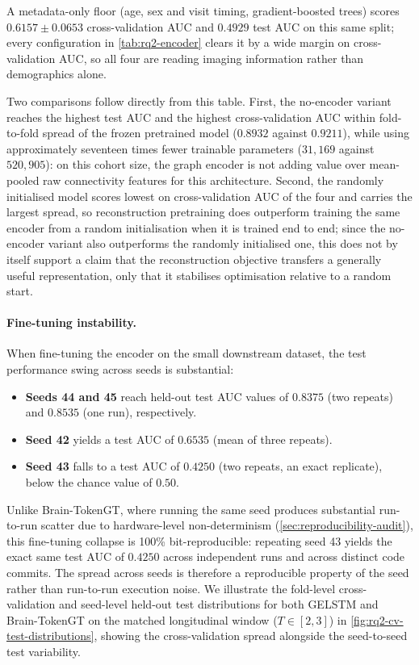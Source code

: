 A metadata-only floor (age, sex and visit timing, gradient-boosted trees) scores
$0.6157 \pm 0.0653$ cross-validation \ac{AUC} and $0.4929$ test \ac{AUC} on this same split;
every configuration in \autoref{tab:rq2-encoder} clears it by a wide margin on cross-validation
\ac{AUC}, so all four are reading imaging information rather than demographics alone.

Two comparisons follow directly from this table. First, the no-encoder variant reaches the
highest test \ac{AUC} and the highest cross-validation \ac{AUC} within fold-to-fold spread
of the frozen pretrained model ($0.8932$ against $0.9211$), while using approximately
seventeen times fewer trainable parameters ($31{,}169$ against $520{,}905$): on this cohort
size, the graph encoder is not adding value over mean-pooled raw connectivity features for
this architecture. Second, the randomly initialised model scores lowest on cross-validation
\ac{AUC} of the four and carries the largest spread, so reconstruction pretraining does
outperform training the same encoder from a random initialisation when it is trained end to
end; since the no-encoder variant also outperforms the randomly initialised one, this does not
by itself support a claim that the reconstruction objective transfers a generally useful
representation, only that it stabilises optimisation relative to a random start.

\paragraph{Fine-tuning instability.} When fine-tuning the encoder on the small downstream dataset, the test performance swing across seeds is substantial:
\begin{itemize}
  \item \textbf{Seeds 44 and 45} reach held-out test \ac{AUC} values of $0.8375$ (two repeats) and $0.8535$ (one run), respectively.
  \item \textbf{Seed 42} yields a test \ac{AUC} of $0.6535$ (mean of three repeats).
  \item \textbf{Seed 43} falls to a test \ac{AUC} of $0.4250$ (two repeats, an exact replicate), below the chance value of $0.50$.
\end{itemize}
Unlike Brain-TokenGT, where running the same seed produces substantial run-to-run scatter due to hardware-level non-determinism (\autoref{sec:reproducibility-audit}), this fine-tuning collapse is 100\% bit-reproducible: repeating seed 43 yields the exact same test \ac{AUC} of $0.4250$ across independent runs and across distinct code commits. The spread across seeds is therefore a reproducible property of the seed rather than run-to-run execution noise. We illustrate the fold-level cross-validation and seed-level held-out test distributions for both \ac{GELSTM} and Brain-TokenGT on the matched longitudinal window ($T \in [2, 3]$) in \autoref{fig:rq2-cv-test-distributions}, showing the cross-validation spread alongside the seed-to-seed test variability.

